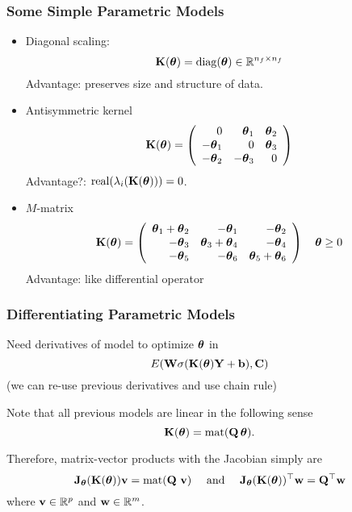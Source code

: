 \documentclass[12pt,fleqn,handout]{beamer}
\begin{document}
\begin{frame}\frametitle{Some Simple Parametric Models}
	
	\begin{itemize}
		\item Diagonal scaling:
		$$
			{\bf K}({\boldsymbol \theta}) = {\rm diag}({\boldsymbol \theta}) \in \mathbb{R}^{n_f\times n_f}
		$$
		Advantage: preserves size and structure of data.
		\pause
		\item Antisymmetric kernel
		$$
			{\bf K}({\boldsymbol \theta}) = \left(
				\begin{array}{rrr}
					0 & {\boldsymbol \theta}_1 & {\boldsymbol \theta}_2 \\
					-{\boldsymbol \theta}_1 & 0 & {\boldsymbol \theta}_3 \\
					-{\boldsymbol \theta}_2 & -{\boldsymbol \theta}_3 & 0
				\end{array}
			\right)
		$$
		Advantage?: ${\rm real}(\lambda_i({\bf K}({\boldsymbol \theta}))) = 0$. 
		\pause
		\item $M$-matrix
		$$
		{\bf K}({\boldsymbol \theta}) = \left(
				\begin{array}{rrr}
					{\boldsymbol \theta}_1+{\boldsymbol \theta}_2 & -{\boldsymbol \theta}_1 & -{\boldsymbol \theta}_2 \\
					-{\boldsymbol \theta}_3 & {\boldsymbol \theta}_3 + {\boldsymbol \theta}_4 & -{\boldsymbol \theta}_4 \\
					-{\boldsymbol \theta}_5 & -{\boldsymbol \theta}_6 & {\boldsymbol \theta}_5+{\boldsymbol \theta}_6
				\end{array}
			\right)
			\quad {\boldsymbol \theta} \geq 0
		$$
		Advantage: like differential operator
	\end{itemize}
\end{frame}

\begin{frame}
	\frametitle{Differentiating Parametric Models}
	Need derivatives of model to optimize ${\boldsymbol \theta}$ in
	$$
		E({\bf W} \sigma({\bf K}({\boldsymbol \theta}){\bf Y}+{\bf b}),{\bf C}) 
	$$
	(we can re-use previous derivatives and use chain rule)
	
	\bigskip
	\pause
	
	Note that all previous models are linear in the following sense
	$$
		{\bf K}({\boldsymbol \theta}) = {\rm mat}({\bf Q}\, {\boldsymbol \theta}).
	$$
	
	\bigskip
	\pause
	
	Therefore, matrix-vector products with the Jacobian simply are
	$$
		{\bf J}_{\boldsymbol \theta} ({\bf K}({\boldsymbol \theta})) {\bf v}  = {\rm mat}({\bf Q} \ {\bf v})\quad\text{ and }\quad
		{\bf J}_{\boldsymbol \theta} ({\bf K}({\boldsymbol \theta}))^\top {\bf w}  = {\bf Q}^\top {\bf w}
	$$
	where ${\bf v} \in \mathbb{R}^p$ and ${\bf w} \in \mathbb{R}^m$.
\end{frame}
\end{document}
